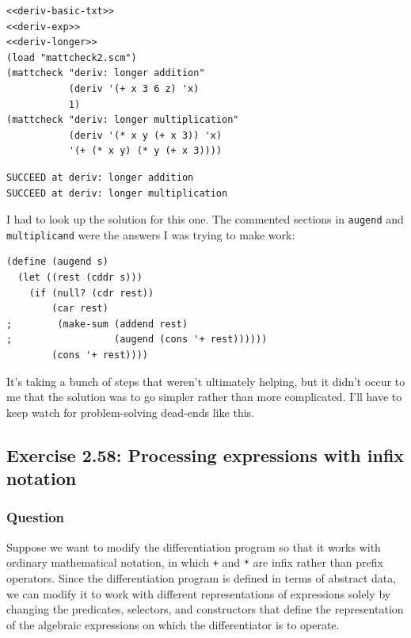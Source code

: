 \documentclass[final,fleqn,titlepage,twoside]{article}
\begin{document}
\begin{verbatim}
<<deriv-basic-txt>>
<<deriv-exp>>
<<deriv-longer>>
(load "mattcheck2.scm")
(mattcheck "deriv: longer addition"
           (deriv '(+ x 3 6 z) 'x)
           1)
(mattcheck "deriv: longer multiplication"
           (deriv '(* x y (+ x 3)) 'x)
           '(+ (* x y) (* y (+ x 3))))
\end{verbatim}

\begin{verbatim}
SUCCEED at deriv: longer addition
SUCCEED at deriv: longer multiplication
\end{verbatim}

I had to look up the solution for this one. The commented sections in
\texttt{augend} and \texttt{multiplicand} were the answers I was trying to
make work:
\begin{verbatim}
(define (augend s)
  (let ((rest (cddr s)))
    (if (null? (cdr rest))
        (car rest)
;        (make-sum (addend rest)
;                  (augend (cons '+ rest))))))
        (cons '+ rest))))
\end{verbatim}

It's taking a bunch of steps that weren't ultimately helping, but it didn't
occur to me that the solution was to go simpler rather than more complicated.
I'll have to keep watch for problem-solving dead-ends like this.

\subsection{Exercise 2.58: Processing expressions with infix notation}
\label{sec:org3821004}
\subsubsection{Question}
\label{sec:org40a215f}
Suppose we want to modify the differentiation program so that it works with
ordinary mathematical notation, in which \texttt{+} and \texttt{*} are
infix rather than prefix operators. Since the differentiation program is defined
in terms of abstract data, we can modify it to work with different
representations of expressions solely by changing the predicates, selectors, and
constructors that define the representation of the algebraic expressions on
which the differentiator is to operate.
\end{document}
